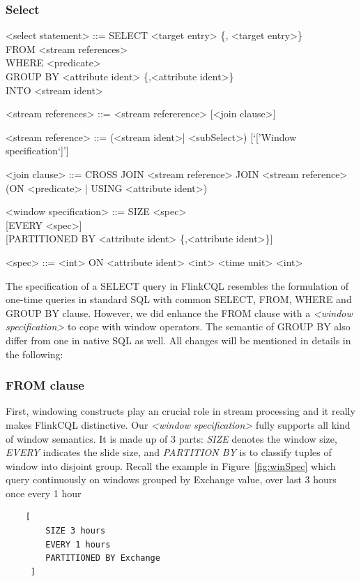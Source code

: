 \subsubsection{Select}
\begin{grammar}
<select statement> ::= SELECT <target entry> \{, <target entry>\}\\
	FROM <stream references> \\
	WHERE <predicate> \\
	GROUP BY <attribute ident> \{,<attribute ident>\} \\
	INTO <stream ident>
	
<stream references> ::= <stream refererence> [<join clause>]

<stream reference> ::= (<stream ident>| <subSelect>) [`['Window specification`]']

<join clause> ::= CROSS JOIN <stream reference>
				\alt [INNER] JOIN <stream  reference> (ON <predicate> | USING <attribute ident>)

<window specification> ::= 
								SIZE <spec> \\
								{ }[EVERY <spec>]\\
								{ }[PARTITIONED BY <attribute ident> \{,<attribute ident>\}]

<spec> ::= <int> ON <attribute ident>
			\alt <int> <time unit>
			\alt <int>
\end{grammar}

The specification of a SELECT query in FlinkCQL resembles the formulation of one-time queries in standard SQL with common SELECT, FROM, WHERE and GROUP BY clause. However, we did enhance the FROM clause with a \textit{<window specification>} to cope with window operators. The semantic of GROUP BY  also differ from one in native SQL as well. All changes will be mentioned in details in the following:

\subsubsection*{FROM clause}
First, windowing constructs play an crucial role in stream processing and it really makes FlinkCQL distinctive. Our \textit{<window specification>} fully supports all kind of window semantics. It is made up of 3 parts: \textit{SIZE} denotes the window size, \textit{EVERY} indicates the slide size, and \textit{PARTITION BY} is to classify tuples of window into disjoint group. Recall the example in Figure~\ref{fig:winSpec} which query continuously on   windows grouped by Exchange value, over last 3 hours once every 1 hour
\begin{lstlisting}
	[
		SIZE 3 hours 
		EVERY 1 hours 
	 	PARTITIONED BY Exchange
	 ]
\end{lstlisting}

